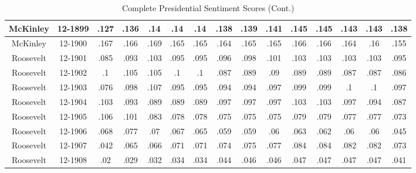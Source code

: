 \begin{sidewaystable}
\begin{singlespace}
\begin{center}
\begin{tabular}{||c c c c c c c c c c c c c c c||}
\hline
McKinley & 12-1899 & .127 & .136 & .14 & .14 & .14 & .138 & .139 & .141 & .145 & .145 & .143 & .143 & .138 \\ 
\hline
McKinley & 12-1900 & .167 & .166 & .169 & .165 & .165 & .164 & .165 & .165 & .166 & .166 & .164 & .16 & .155 \\ 
\hline
Roosevelt & 12-1901 & .085 & .093 & .103 & .095 & .095 & .096 & .098 & .101 & .103 & .103 & .103 & .103 & .095 \\ 
\hline
Roosevelt & 12-1902 & .1 & .105 & .105 & .1 & .1 & .087 & .089 & .09 & .089 & .089 & .087 & .087 & .086 \\ 
\hline
Roosevelt & 12-1903 & .076 & .098 & .107 & .095 & .095 & .094 & .094 & .097 & .099 & .099 & .1 & .1 & .097 \\ 
\hline
Roosevelt & 12-1904 & .103 & .093 & .089 & .089 & .089 & .097 & .097 & .097 & .103 & .103 & .097 & .094 & .087 \\ 
\hline
Roosevelt & 12-1905 & .106 & .101 & .083 & .078 & .078 & .075 & .075 & .075 & .079 & .079 & .077 & .077 & .073 \\ 
\hline
Roosevelt & 12-1906 & .068 & .077 & .07 & .067 & .065 & .059 & .059 & .06 & .063 & .062 & .06 & .06 & .045 \\ 
\hline
Roosevelt & 12-1907 & .042 & .065 & .066 & .071 & .071 & .074 & .075 & .077 & .084 & .084 & .082 & .082 & .073 \\ 
\hline
Roosevelt & 12-1908 & .02 & .029 & .032 & .034 & .034 & .044 & .046 & .046 & .047 & .047 & .047 & .047 & .041 \\ 
\hline
 \hline
 \end{tabular}
\end{center}
\caption{Complete Presidential Sentiment Scores (Cont.)}
\label{appendix:sent5}
\end{singlespace}
\end{sidewaystable}

